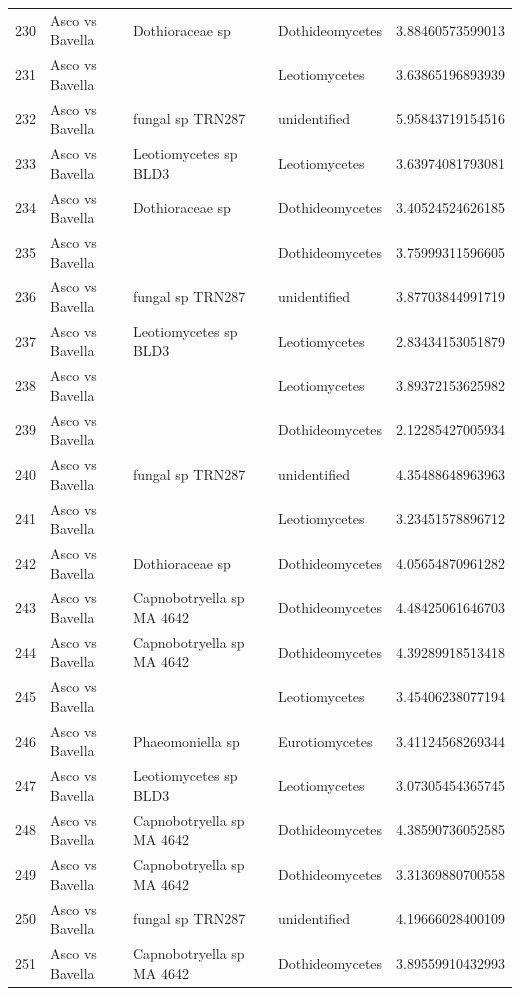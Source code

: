 \documentclass[12pt]{article}\usepackage[]{graphicx}\usepackage[]{color}
\numberwithin{figure}{section}
\begin{document}
\begin{table}[ht]
\begin{tabular}{lllll}
  230 & Asco vs Bavella & Dothioraceae sp & Dothideomycetes & 3.88460573599013 \\ 
  231 & Asco vs Bavella &  & Leotiomycetes & 3.63865196893939 \\ 
  232 & Asco vs Bavella & fungal sp TRN287 & unidentified & 5.95843719154516 \\ 
  233 & Asco vs Bavella & Leotiomycetes sp BLD3 & Leotiomycetes & 3.63974081793081 \\ 
  234 & Asco vs Bavella & Dothioraceae sp & Dothideomycetes & 3.40524524626185 \\ 
  235 & Asco vs Bavella &  & Dothideomycetes & 3.75999311596605 \\ 
  236 & Asco vs Bavella & fungal sp TRN287 & unidentified & 3.87703844991719 \\ 
  237 & Asco vs Bavella & Leotiomycetes sp BLD3 & Leotiomycetes & 2.83434153051879 \\ 
  238 & Asco vs Bavella &  & Leotiomycetes & 3.89372153625982 \\ 
  239 & Asco vs Bavella &  & Dothideomycetes & 2.12285427005934 \\ 
  240 & Asco vs Bavella & fungal sp TRN287 & unidentified & 4.35488648963963 \\ 
  241 & Asco vs Bavella &  & Leotiomycetes & 3.23451578896712 \\ 
  242 & Asco vs Bavella & Dothioraceae sp & Dothideomycetes & 4.05654870961282 \\ 
  243 & Asco vs Bavella & Capnobotryella sp MA 4642 & Dothideomycetes & 4.48425061646703 \\ 
  244 & Asco vs Bavella & Capnobotryella sp MA 4642 & Dothideomycetes & 4.39289918513418 \\ 
  245 & Asco vs Bavella &  & Leotiomycetes & 3.45406238077194 \\ 
  246 & Asco vs Bavella & Phaeomoniella sp & Eurotiomycetes & 3.41124568269344 \\ 
  247 & Asco vs Bavella & Leotiomycetes sp BLD3 & Leotiomycetes & 3.07305454365745 \\ 
  248 & Asco vs Bavella & Capnobotryella sp MA 4642 & Dothideomycetes & 4.38590736052585 \\ 
  249 & Asco vs Bavella & Capnobotryella sp MA 4642 & Dothideomycetes & 3.31369880700558 \\ 
  250 & Asco vs Bavella & fungal sp TRN287 & unidentified & 4.19666028400109 \\ 
  251 & Asco vs Bavella & Capnobotryella sp MA 4642 & Dothideomycetes & 3.89559910432993 \\ 

\end{tabular}
\end{table}
\end{document}
